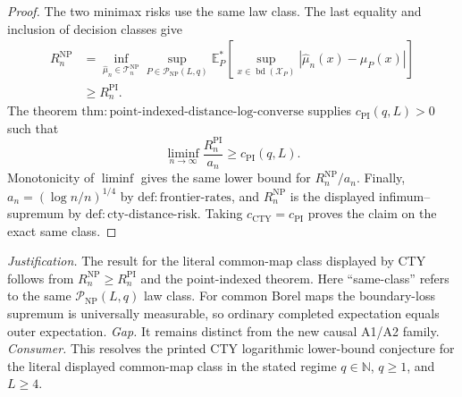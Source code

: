 \documentclass{article}
\begin{document}
\begin{proof}
The two minimax risks use the same law class.  The last equality and inclusion of decision classes give
\[
\begin{aligned}
 R_n^{\mathrm{NP}}
 &=\inf_{\widehat\mu_n\in\mathcal T_n^{\mathrm{NP}}}
   \sup_{P\in\mathcal P_{\mathrm{NP}}(L,q)}
   \mathbb E_P^*\!\left[
     \sup_{x\in\operatorname{bd}(\mathcal X_P)}
     |\widehat\mu_n(x)-\mu_P(x)|
   \right]\\
 &\geq R_n^{\mathrm{PI}}.
\end{aligned}
\]
The theorem \(\mathrm{thm:point\text{-}indexed\text{-}distance\text{-}log\text{-}converse}\) supplies \(c_{\mathrm{PI}}(q,L)>0\) such that
\[
 \liminf_{n\to\infty}\frac{R_n^{\mathrm{PI}}}{a_n}
 \geq c_{\mathrm{PI}}(q,L).
\]
Monotonicity of \(\liminf\) gives the same lower bound for \(R_n^{\mathrm{NP}}/a_n\).  Finally, \(a_n=(\log n/n)^{1/4}\) by \(\mathrm{def:frontier\text{-}rates}\), and \(R_n^{\mathrm{NP}}\) is the displayed infimum--supremum by \(\mathrm{def:cty\text{-}distance\text{-}risk}\).  Taking \(c_{\mathrm{CTY}}=c_{\mathrm{PI}}\) proves the claim on the exact same class.
\end{proof}
\par\smallskip\noindent \textit{Justification.} The result for the literal common-map class displayed by CTY follows from \(R_n^{\mathrm{NP}}\geq R_n^{\mathrm{PI}}\) and the point-indexed theorem.  Here ``same-class'' refers to the same \(\mathcal P_{\mathrm{NP}}(L,q)\) law class.  For common Borel maps the boundary-loss supremum is universally measurable, so ordinary completed expectation equals outer expectation. \textit{Gap.} It remains distinct from the new causal A1/A2 family. \textit{Consumer.} This resolves the printed CTY logarithmic lower-bound conjecture for the literal displayed common-map class in the stated regime \(q\in\mathbb N\), \(q\geq1\), and \(L\geq4\).
\end{document}
